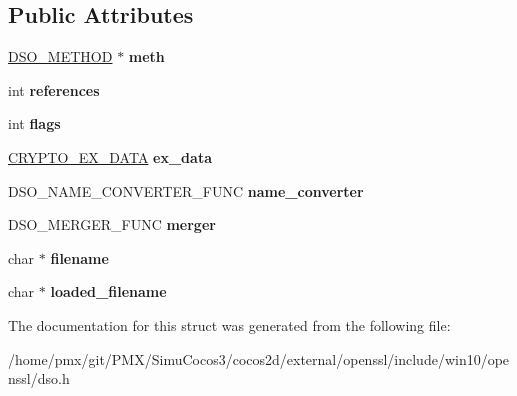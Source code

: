 \subsection*{Public Attributes}
\begin{DoxyCompactItemize}
\item 
\mbox{\label{structdso__st_a8a987f21e7657122da916308d8bf430f}} 
\hyperlink{structdso__meth__st}{D\+S\+O\+\_\+\+M\+E\+T\+H\+OD} $\ast$ {\bfseries meth}
\item 
\mbox{\label{structdso__st_a6db2623dcc06fe53f8ae4f0487c4fbf5}} 
int {\bfseries references}
\item 
\mbox{\label{structdso__st_a474a4c01444751dbf14d9ac94729e9b0}} 
int {\bfseries flags}
\item 
\mbox{\label{structdso__st_a77898a2a84603a2bca699d2d6dcf9b8f}} 
\hyperlink{structcrypto__ex__data__st}{C\+R\+Y\+P\+T\+O\+\_\+\+E\+X\+\_\+\+D\+A\+TA} {\bfseries ex\+\_\+data}
\item 
\mbox{\label{structdso__st_ac326d621386b5835c2686269eab8c96b}} 
D\+S\+O\+\_\+\+N\+A\+M\+E\+\_\+\+C\+O\+N\+V\+E\+R\+T\+E\+R\+\_\+\+F\+U\+NC {\bfseries name\+\_\+converter}
\item 
\mbox{\label{structdso__st_a00298e1ff0f65f22b0ec1229d7e8bac1}} 
D\+S\+O\+\_\+\+M\+E\+R\+G\+E\+R\+\_\+\+F\+U\+NC {\bfseries merger}
\item 
\mbox{\label{structdso__st_ae981476b0fae6034675c02776f7303d8}} 
char $\ast$ {\bfseries filename}
\item 
\mbox{\label{structdso__st_a96bd03d5fd52dba938c3ba0e28b74946}} 
char $\ast$ {\bfseries loaded\+\_\+filename}
\end{DoxyCompactItemize}


The documentation for this struct was generated from the following file\+:\begin{DoxyCompactItemize}
\item 
/home/pmx/git/\+P\+M\+X/\+Simu\+Cocos3/cocos2d/external/openssl/include/win10/openssl/dso.\+h\end{DoxyCompactItemize}

